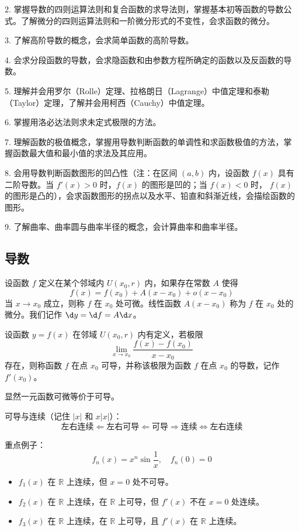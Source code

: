 2. 掌握导数的四则运算法则和复合函数的求导法则，掌握基本初等函数的导数公式。了解微分的四则运算法则和一阶微分形式的不变性，会求函数的微分。

3. 了解高阶导数的概念，会求简单函数的高阶导数。

4. 会求分段函数的导数，会求隐函数和由参数方程所确定的函数以及反函数的导数。

5. 理解并会用罗尔（Rolle）定理、拉格朗日（Lagrange）中值定理和泰勒（Taylor）定理，了解并会用柯西（Cauchy）中值定理。

6. 掌握用洛必达法则求未定式极限的方法。

7. 理解函数的极值概念，掌握用导数判断函数的单调性和求函数极值的方法，掌握函数最大值和最小值的求法及其应用。

8. 会用导数判断函数图形的凹凸性（注：在区间 $(a, b)$ 内，设函数 $f(x)$ 具有二阶导数。当 $f'(x) > 0$ 时，$f(x)$ 的图形是凹的；当 $f(x) < 0$ 时， $f(x)$ 的图形是凸的），会求函数图形的拐点以及水平、铅直和斜渐近线，会描绘函数的图形。

9. 了解曲率、曲率圆与曲率半径的概念，会计算曲率和曲率半径。

\subsection{导数}

\begin{definition}[微分]
	设函数 $f$ 定义在某个邻域内 $U(x_0, r)$ 内，如果存在常数 $A$ 使得
	\[ f(x) = f(x_0) + A(x - x_0) + o(x - x_0) \]
	当 $x \to x_0$ 成立，则称 $f$ 在 $x_0$ 处可微。线性函数 $A(x-x_0)$ 称为 $f$ 在 $x_0$ 处的微分。我们记作 $\d y = \d f = A \d x$。
\end{definition}

\begin{definition}[导数]
	设函数 $y=f(x)$ 在邻域 $U(x_0, r)$ 内有定义，若极限
	\[ \lim_{x\to x_0}\frac{f(x)-f(x_0)}{x-x_0} \]
	存在，则称函数 $f$ 在点 $x_0$ 可导，并称该极限为函数 $f$ 在点 $x_0$ 的导数，记作 $f'(x_0)$。
\end{definition}

显然一元函数可微等价于可导。

可导与连续（记住 $|x|$ 和 $x|x|$）：
\[ \text{左右连续} \Leftarrow \text{左右可导}  \Leftarrow \text{可导}  \Rightarrow \text{连续} \Leftrightarrow \text{左右连续} \]

重点例子：
\[ f_n(x) = x^n \sin \frac{1}{x}, \quad f_n(0) = 0 \]
\begin{itemize}
	\item $f_1(x)$ 在 $\mathbb{R}$ 上连续，但 $x=0$ 处不可导。
	\item $f_2(x)$ 在 $\mathbb{R}$ 上连续，在 $\mathbb{R}$ 上可导，但 $f'(x)$ 不在 $x=0$ 处连续。
	\item $f_3(x)$ 在 $\mathbb{R}$ 上连续，在 $\mathbb{R}$ 上可导，且 $f'(x)$ 在 $\mathbb{R}$ 上连续。
\end{itemize}

